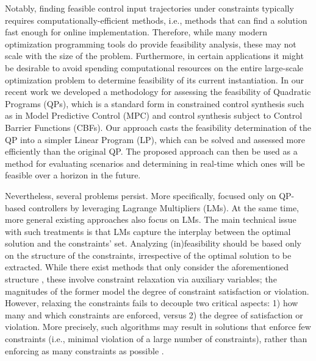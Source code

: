 \documentclass[letterpaper, 10 pt, conference]{ieeeconf}  %
\begin{document}
\par 
Notably, finding feasible control input trajectories under constraints typically requires computationally-efficient methods, i.e., methods that can find a solution fast enough for online implementation. Therefore, while many modern optimization programming tools do provide feasibility analysis, these may not scale with the size of the problem. Furthermore, in certain applications it might be desirable to avoid spending computational resources on the entire large-scale optimization problem to determine feasibility of its current instantiation. In our recent work \cite{rousseas2025feasibilityevaluationquadraticprograms} we developed a methodology for assessing the feasibility of Quadratic Programs (QPs), which is a standard form in constrained control synthesis such as in Model Predictive Control (MPC) and control synthesis subject to Control Barrier Functions (CBFs). Our approach casts the feasibility determination of the QP into a simpler Linear Program (LP), which can be solved and assessed more efficiently than the original QP. The proposed approach can then be used as a method for evaluating scenarios and determining in real-time which ones will be feasible over a horizon in the future. 
\par 
{
\color{blue}
Nevertheless, several problems persist. More specifically, \cite{rousseas2025feasibilityevaluationquadraticprograms} focused only on QP-based controllers by leveraging Lagrange Multipliers (LMs). At the same time, more general existing approaches \cite{hardik2024} also focus on LMs. The main technical issue with such treatments is that LMs capture the interplay between the optimal solution and the constraints' set. Analyzing (in)feasibility should be based only on the structure of the constraints, irrespective of the optimal solution to be extracted. While there exist methods that only consider the aforementioned structure \cite{Chinneck2010-qg,chinneck}, these involve constraint relaxation via auxiliary variables; the magnitudes of the former model the degree of constraint satisfaction or violation. However, relaxing the constraints fails to decouple two critical aspects: 1) how many and which constraints are enforced, versus 2) the degree of satisfaction or violation. More precisely, such algorithms may result in solutions that enforce few constraints (i.e., minimal violation of a large number of constraints), rather than enforcing as many constraints as possible \cite{chinneck_textbook}.    
}
\end{document}
